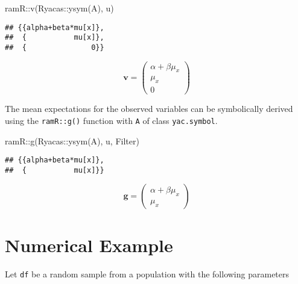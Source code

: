 \documentclass[
]{book}
\newenvironment{Shaded}{\begin{snugshade}}{\end{snugshade}}
\newcommand{\FunctionTok}[1]{\textcolor[rgb]{0.00,0.00,0.00}{#1}}
\newcommand{\NormalTok}[1]{#1}
\newcommand{\SpecialCharTok}[1]{\textcolor[rgb]{0.00,0.00,0.00}{#1}}
\theoremstyle{definition}
\theoremstyle{definition}
\theoremstyle{definition}
\theoremstyle{remark}
\begin{document}
\begin{Shaded}
\begin{Highlighting}[]
\NormalTok{ramR}\SpecialCharTok{::}\FunctionTok{v}\NormalTok{(Ryacas}\SpecialCharTok{::}\FunctionTok{ysym}\NormalTok{(A), u)}
\end{Highlighting}
\end{Shaded}

\begin{verbatim}
## {{alpha+beta*mu[x]},
##  {           mu[x]},
##  {               0}}
\end{verbatim}

\begin{equation*}\mathbf{v} =\left( \begin{array}{c} \alpha  + \beta  \mu  _{x} \\ \mu  _{x} \\ 0 \end{array} \right)\end{equation*}

The mean expectations for the observed variables
can be symbolically derived using the \texttt{ramR::g()} function
with \texttt{A} of class \texttt{yac.symbol}.

\begin{Shaded}
\begin{Highlighting}[]
\NormalTok{ramR}\SpecialCharTok{::}\FunctionTok{g}\NormalTok{(Ryacas}\SpecialCharTok{::}\FunctionTok{ysym}\NormalTok{(A), u, Filter)}
\end{Highlighting}
\end{Shaded}

\begin{verbatim}
## {{alpha+beta*mu[x]},
##  {           mu[x]}}
\end{verbatim}

\begin{equation*}\mathbf{g} =\left( \begin{array}{c} \alpha  + \beta  \mu  _{x} \\ \mu  _{x} \end{array} \right)\end{equation*}

\hypertarget{numerical-example}{%
\section{Numerical Example}\label{numerical-example}}

Let \texttt{df} be a random sample from a population with the following parameters
\end{document}
